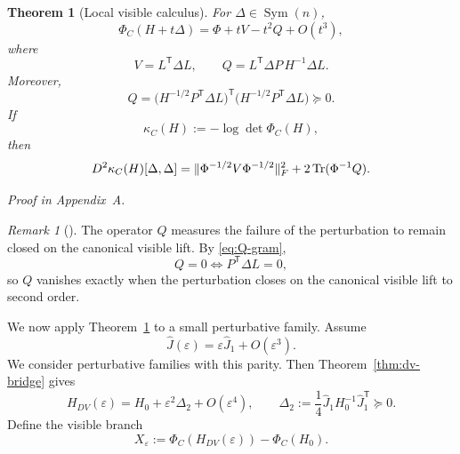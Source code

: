 \documentclass[11pt,a4paper]{article}
\numberwithin{equation}{section}
\DeclareMathOperator{\Tr}{Tr}
\DeclareMathOperator{\Sym}{Sym}
\DeclarePairedDelimiter{\norm}{\lVert}{\rVert}
\theoremstyle{thmcompact}
\newtheorem{theorem}{Theorem}[section]
\theoremstyle{remark}
\newtheorem*{remarkplain}{Remark}
\newenvironment{remark}[1][]%
{\begin{remarkbox}\begin{remarkplain}[#1]\normalfont}
{\end{remarkplain}\end{remarkbox}}
\newcommand{\proofappendix}{\par{\hfill\scriptsize\emph{Proof in Appendix~A.}}\par}
\begin{document}
\begin{theorem}[Local visible calculus]
\label{thm:local-calculus}
For $\Delta\in\Sym(n)$,
\begin{equation}
\Phi_C(H+t\Delta)=\Phi+tV-t^2Q+O(t^3),
\label{eq:local-expansion}
\end{equation}
where
\begin{equation}
V=L^{\mathsf T}\Delta L,
\qquad
Q=L^{\mathsf T}\Delta P\,H^{-1}\Delta L.
\label{eq:VQ-def}
\end{equation}
Moreover,
\begin{equation}
Q=
\bigl(H^{-1/2}P^{\mathsf T}\Delta L\bigr)^{\mathsf T}
\bigl(H^{-1/2}P^{\mathsf T}\Delta L\bigr)
\succeq 0.
\label{eq:Q-gram}
\end{equation}
If
\begin{equation}
\kappa_C(H):=-\log\det\Phi_C(H),
\label{eq:kappa-def}
\end{equation}
then
\begin{equation}
D^2\kappa_C(H)[\Delta,\Delta]
=
\norm{\Phi^{-1/2}V\Phi^{-1/2}}_F^2+2\Tr(\Phi^{-1}Q).
\label{eq:det-split}
\end{equation}
\end{theorem}

\proofappendix

\begin{remark}
The operator $Q$ measures the failure of the perturbation to remain closed on the canonical visible lift. By \eqref{eq:Q-gram},
\[
Q=0
\iff
P^{\mathsf T}\Delta L=0,
\]
so $Q$ vanishes exactly when the perturbation closes on the canonical visible lift to second order.
\end{remark}

We now apply Theorem~\ref{thm:local-calculus} to a small perturbative family. Assume
\begin{equation}
\widehat J(\varepsilon)=\varepsilon\widehat J_1+O(\varepsilon^3).
\label{eq:J-small}
\end{equation}
We consider perturbative families with this parity.
Then Theorem~\ref{thm:dv-bridge} gives
\begin{equation}
H_{DV}(\varepsilon)=H_0+\varepsilon^2\Delta_2+O(\varepsilon^4),
\qquad
\Delta_2:=\frac14\widehat J_1H_0^{-1}\widehat J_1^{\mathsf T}\succeq 0.
\label{eq:H-small}
\end{equation}
Define the visible branch
\begin{equation}
X_{\varepsilon}:=\Phi_C(H_{DV}(\varepsilon))-\Phi_C(H_0).
\label{eq:visible-branch}
\end{equation}
\end{document}
